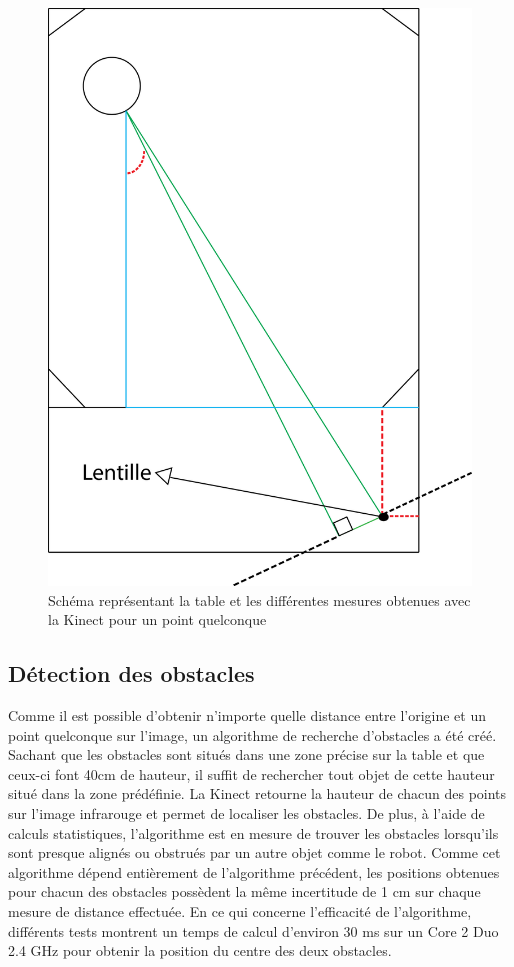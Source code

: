 \begin{figure}[htbp]
\centering
\includegraphics[scale=0.5]{fig/kinect_distance.png}
\caption{Schéma représentant la table et les différentes mesures obtenues avec la Kinect pour un point quelconque}
\label{fig:kinect_distance}
\end{figure}

\subsection{Détection des obstacles}
Comme il est possible d'obtenir n'importe quelle distance entre l'origine et un point quelconque sur l'image, un algorithme de recherche d'obstacles a été créé. Sachant que les obstacles sont situés dans une zone précise sur la table et que ceux-ci font 40cm de hauteur, il suffit de rechercher tout objet de cette hauteur situé dans la zone prédéfinie. La Kinect retourne la hauteur de chacun des points sur l'image infrarouge et permet de localiser les obstacles. De plus, à l'aide de calculs statistiques, l'algorithme est en mesure de trouver les obstacles lorsqu'ils sont presque alignés ou obstrués par un autre objet comme le robot. Comme cet algorithme dépend entièrement de l'algorithme précédent, les positions obtenues pour chacun des obstacles possèdent la même incertitude de 1 cm sur chaque mesure de distance effectuée. En ce qui concerne l'efficacité de l'algorithme, différents tests montrent un temps de calcul d'environ 30 ms sur un Core 2 Duo 2.4 GHz pour obtenir la position du centre des deux obstacles.

